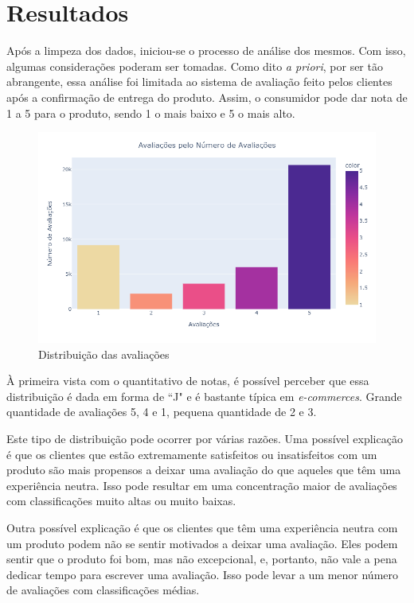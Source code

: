 \section{Resultados}
\label{sec:results}

Após a limpeza dos dados, iniciou-se o processo de análise dos mesmos. Com isso, algumas considerações poderam ser tomadas. Como dito \textit{a priori}, por ser tão abrangente, essa análise foi limitada ao sistema de avaliação feito pelos clientes após a confirmação de entrega do produto. Assim, o consumidor pode dar nota de 1 a 5 para o produto, sendo 1 o mais baixo e 5 o mais alto.


\begin{figure}[H]
    \centering
    \includegraphics[trim={0cm 2cm 3cm 2cm},clip,scale=0.65]{./figs/eval.png}
    \caption{Distribuição das avaliações}
    \label{fig:evalDistribution}
\end{figure}

À primeira vista com o quantitativo de notas, é possível perceber que essa  distribuição é dada em forma de ``J" e é bastante típica em \textit{e-commerces}. Grande  quantidade de avaliações 5, 4 e 1, pequena quantidade de 2 e 3.

Este tipo de distribuição pode ocorrer por várias razões. Uma possível explicação é que os clientes que estão extremamente satisfeitos ou insatisfeitos com um produto são mais propensos a deixar uma avaliação do que aqueles que têm uma experiência neutra. Isso pode resultar em uma concentração maior de avaliações com classificações muito altas ou muito baixas.

Outra possível explicação é que os clientes que têm uma experiência neutra com um produto podem não se sentir motivados a deixar uma avaliação. Eles podem sentir que o produto foi bom, mas não excepcional, e, portanto, não vale a pena dedicar tempo para escrever uma avaliação. Isso pode levar a um menor número de avaliações com classificações médias.

